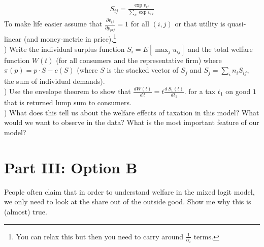 \documentclass[12pt]{article}
\begin{document}
\begin{eqnarray*}
S_{ij} = \frac{\exp v_{ij}}{\sum_k \exp v_{ik}}
\end{eqnarray*}
To make life easier assume that $\frac{\partial v_{ij}}{\partial p_{pij}}=1$ for all $(i,j)$ or that utility is quasi-linear (and money-metric in price).\footnote{You can relax this but then you need to carry around $\frac{1}{\alpha_i}$ terms.}\\

) Write the individual surplus function $S_i = E[\max_j u_{ij}]$ and the total welfare function $W(t)$ (for all consumers and the representative firm) where $\pi(p) = p \cdot S- c(S)$ (where $S$ is the stacked vector of $S_{j}$ and $S_j = \sum_i n_i S_{ij}$, the sum of individual demands).\\


) Use the envelope theorem to show that $\frac{d W(t)}{d\, t} = t \frac{d\, S_1(t)}{d t_1}$. for a tax $t_1$ on good $1$ that is returned lump sum to consumers.\\

) What does this tell us about the welfare effects of taxation in this model? What would we want to observe in the data? What is the most important feature of our model?

\section*{\normalsize Part III: Option B}
People often claim that in order to understand welfare in the mixed logit model, we only need to look at the share out of the outside good. Show me why this is (almost) true.
\end{document}
